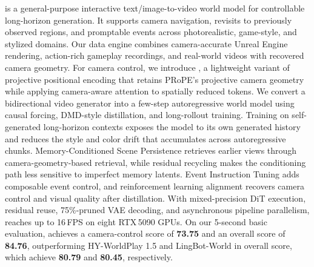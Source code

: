 \method{} is a general-purpose interactive text/image-to-video world model for
controllable long-horizon generation.
It supports camera navigation, revisits to previously observed regions, and
promptable events across photorealistic, game-style, and stylized domains.
Our data engine combines camera-accurate Unreal Engine rendering, action-rich
gameplay recordings, and real-world videos with recovered camera geometry.
For camera control, we introduce \eprope{}, a lightweight variant of projective
positional encoding that retains PRoPE's projective camera geometry while
applying camera-aware attention to spatially reduced tokens.
We convert a bidirectional video generator into a few-step autoregressive world
model using causal forcing, DMD-style distillation, and long-rollout training.
Training on self-generated long-horizon contexts exposes the model to its own
generated history and reduces the style and color drift that accumulates across
autoregressive chunks.
Memory-Conditioned Scene Persistence retrieves earlier views through
camera-geometry-based retrieval, while residual recycling makes the conditioning
path less sensitive to imperfect memory latents.
Event Instruction Tuning adds composable event control, and reinforcement
learning alignment recovers camera control and visual quality after distillation.
With mixed-precision DiT execution, residual reuse, 75\%-pruned VAE decoding,
and asynchronous pipeline parallelism, \method{} reaches up to 16\,FPS on eight
RTX\,5090 GPUs.
On our 5-second basic evaluation, \method{} achieves a camera-control score
of \textbf{73.75} and an overall score of \textbf{84.76}, outperforming
HY-WorldPlay 1.5 and LingBot-World in overall score, which achieve \textbf{80.79}
and \textbf{80.45}, respectively.